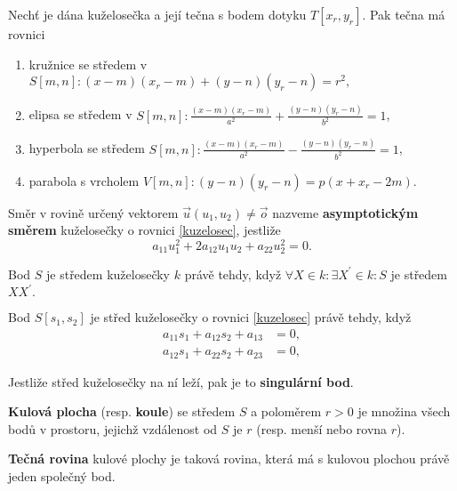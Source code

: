 \begin{veta}
    Nechť je dána kuželosečka a její tečna s bodem dotyku $T[x_r,y_r].$ Pak tečna
    má rovnici
    \begin{enumerate}[$i.$]
    \item kružnice se středem v $S[m,n]:(x-m)(x_r-m)+(y-n)(y_r-n)=r^2,$
   	\item elipsa se středem v $S[m,n]:\frac{(x-m)(x_r-m)}{a^2}+\frac{(y-n)(y_r-n)}{b^2}=1$,
   	\item hyperbola se středem $S[m,n]:\frac{(x-m)(x_r-m)}{a^2}-\frac{(y-n)(y_r-n)}{b^2}=1$,
   	\item parabola s vrcholem $V[m,n]:(y-n)(y_r-n)=p(x+x_r-2m).$
    \end{enumerate}
\end{veta}

\begin{definition}
    Směr v rovině určený vektorem $\vec u(u_1, u_2)\ne \vec o$ nazveme
    \textbf{asymptotickým směrem} kuželosečky o rovnici \ref{kuzelosec}, jestliže
    $$a_{11}u_1^2 + 2a_{12}u_1u_2+a_{22}u_2^2=0.$$
\end{definition}

\begin{definition}
    Bod $S$ je středem kuželosečky $k$ právě tehdy, když $\forall X\in k:\exists X^\prime\in k: S$ je středem $XX^\prime.$
\end{definition}

\begin{veta}
    Bod $S[s_1,s_2]$ je střed kuželosečky o rovnici \ref{kuzelosec} právě tehdy, když
    \begin{align*}
        a_{11}s_1 + a_{12}s_2+a_{13}&=0,\\
        a_{12}s_1 + a_{22}s_2 + a_{23}&=0,
    \end{align*}
\end{veta}

\begin{definition}
    Jestliže střed kuželosečky na ní leží, pak je to \textbf{singulární bod}.
\end{definition}

\begin{definition}
\textbf{Kulová plocha} (resp. \textbf{koule}) se středem $S$ a poloměrem $r>0$ je množina všech bodů v prostoru,
jejichž vzdálenost od $S$ je $r$ (resp. menší nebo rovna $r$).
\end{definition}

\begin{definition}
\textbf{Tečná rovina} kulové plochy je taková rovina, která má s kulovou plochou právě
jeden společný bod.
\end{definition}
